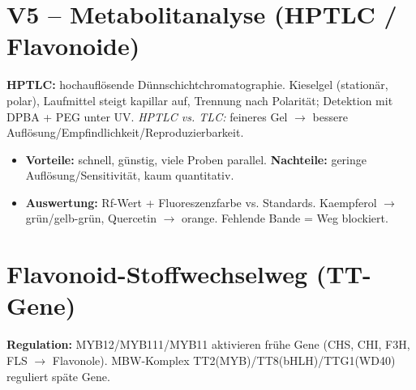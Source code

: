 

\section{V5 -- Metabolitanalyse (HPTLC / Flavonoide)}
\textbf{HPTLC:} hochauflösende Dünnschichtchromatographie. Kieselgel (stationär, polar), Laufmittel steigt kapillar auf, Trennung nach Polarität; Detektion mit DPBA + PEG unter UV. \emph{HPTLC vs. TLC:} feineres Gel $\to$ bessere Auflösung/Empfindlichkeit/Reproduzierbarkeit.
\begin{itemize}
    \item \textbf{Vorteile:} schnell, günstig, viele Proben parallel. \textbf{Nachteile:} geringe Auflösung/Sensitivität, kaum quantitativ.
    \item \textbf{Auswertung:} Rf-Wert + Fluoreszenzfarbe vs. Standards. Kaempferol $\to$ grün/gelb-grün, Quercetin $\to$ orange. Fehlende Bande = Weg blockiert.
\end{itemize}


\section{Flavonoid-Stoffwechselweg (TT-Gene)}
\centering
{}
\vspace{2pt}

\raggedright\textbf{Regulation:} MYB12/MYB111/MYB11 aktivieren frühe Gene (CHS, CHI, F3H, FLS $\to$ Flavonole). MBW-Komplex TT2(MYB)/TT8(bHLH)/TTG1(WD40) reguliert späte Gene.





